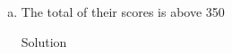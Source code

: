 \documentclass{article}
\begin{document}
\begin{spacing}{1.1}
\begin{homeworkProblem}
\begin{enumerate}[(a)]
\begin{homeworkSection}{Solution}
      \end{homeworkSection}
    \item The total of their scores is above 350
      \begin{homeworkSection}{Solution}
        
      \end{homeworkSection}
  \end{enumerate}
\end{homeworkProblem}

\end{spacing}
\end{document}

